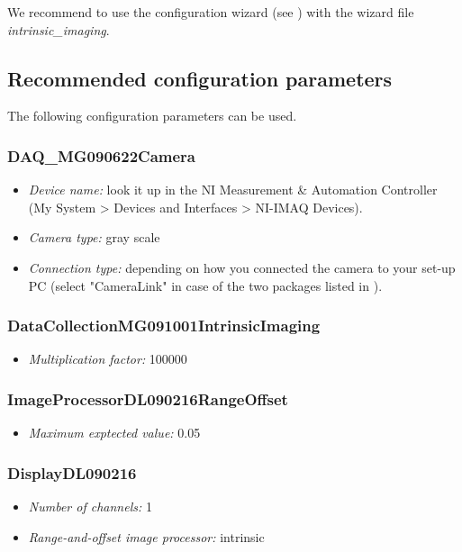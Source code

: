We recommend to use the configuration wizard (see ) with the wizard file \textit{intrinsic_imaging}. 

\subsection{Recommended configuration parameters}
The following configuration parameters can be used.

\subsubsection{DAQ_MG090622Camera}
\begin{itemize}[noitemsep]
	\item \textit{Device name:} look it up in the \ac{NI} Measurement \& Automation Controller (My System > Devices and Interfaces > NI-IMAQ Devices).
 	\item \textit{Camera type:} gray scale
	\item \textit{Connection type:} depending on how you connected the camera to your set-up PC (select "CameraLink" in case of the two packages listed in ).
\end{itemize}

\subsubsection{DataCollectionMG091001IntrinsicImaging}
\begin{itemize}[noitemsep]
	\item \textit{Multiplication factor:} 100000
\end{itemize}

\subsubsection{ImageProcessorDL090216RangeOffset}
\begin{itemize}[noitemsep]
	\item \textit{Maximum exptected value:} 0.05
\end{itemize}

\subsubsection{DisplayDL090216}
\begin{itemize}[noitemsep]
	\item \textit{Number of channels:} 1
	\item \textit{Range-and-offset image processor:} intrinsic
\end{itemize}

